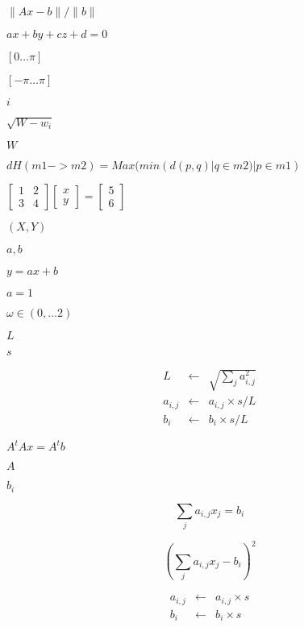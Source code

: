 \documentclass{article}
\begin{document}
$ \| Ax - b \| / \| b \| $
\pagebreak

$ ax + by + cz + d = 0 $
\pagebreak

$ [ 0 \ldots \pi ] $
\pagebreak

$ [-\pi \ldots \pi] $
\pagebreak

$ i $
\pagebreak

$ \sqrt{W - w_i} $
\pagebreak

$ W $
\pagebreak

$dH(m1->m2) = Max(min(d(p,q) | q \in m2) | p \in m1)$
\pagebreak

$ \left[ \begin{array}{ll} 1 & 2 \\ 3 & 4 \end{array} \right] \left[ \begin{array}{l} x \\ y \end{array} \right] = \left[ \begin{array}{l} 5 \\ 6 \end{array} \right] $
\pagebreak

$ (X,Y) $
\pagebreak

$ a,b $
\pagebreak

$ y = ax + b $
\pagebreak

$ a = 1 $
\pagebreak

$ \omega \in (0,\ldots 2) $
\pagebreak

$ L $
\pagebreak

$ s $
\pagebreak

\[ \begin{array}{lcl} L & \leftarrow & \sqrt{\sum_{j} a_{i,j}^2} \\ a_{i,j} & \leftarrow & a_{i,j} \times s / L \\ b_i & \leftarrow & b_i \times s / L \end{array} \]
\pagebreak

$ A^t A x = A^t b $
\pagebreak

$ A $
\pagebreak

$ b_i $
\pagebreak

\[ \sum_j a_{i,j} x_j = b_i \]
\pagebreak

\[ \left( \sum_j a_{i,j} x_j - b_i \right)^2 \]
\pagebreak

\[ \begin{array}{lcl} a_{i,j} & \leftarrow & a_{i,j} \times s \\ b_i & \leftarrow & b_i \times s \end{array} \]
\pagebreak
\end{document}
